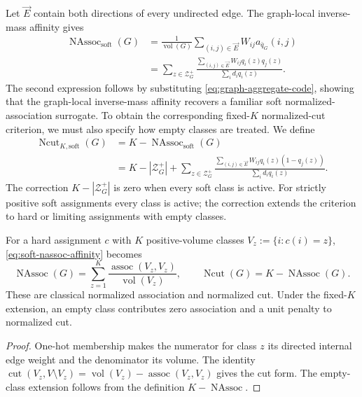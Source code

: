 Let $\vec E$ contain both directions of every undirected edge.
The graph-local inverse-mass affinity gives
\begin{align}
\operatorname{NAssoc}_{\mathrm{soft}}(G)
&=\frac1{\operatorname{vol}(G)}\sum_{(i,j)\in\vec E}W_{ij}a_{\bar q_G}(i,j)\\
&=\sum_{z\in\mathcal Z_G^+}
\frac{\sum_{(i,j)\in\vec E}W_{ij}q_i(z)q_j(z)}{\sum_i d_iq_i(z)}.
\label{eq:soft-nassoc-affinity}
\end{align}
The second expression follows by substituting \cref{eq:graph-aggregate-code}, showing that the graph-local inverse-mass affinity recovers a familiar soft normalized-association surrogate.
To obtain the corresponding fixed-$K$ normalized-cut criterion, we must also specify how empty classes are treated.
We define
\begin{align}
\operatorname{Ncut}_{K,\mathrm{soft}}(G)
&=K-\operatorname{NAssoc}_{\mathrm{soft}}(G)\\
&=K-|\mathcal Z_G^+|
+\sum_{z\in\mathcal Z_G^+}
\frac{\sum_{(i,j)\in\vec E}W_{ij}q_i(z)(1-q_j(z))}
{\sum_i d_iq_i(z)}.
\label{eq:soft-ncut-relational-distortion}
\end{align}
The correction $K-|\mathcal Z_G^+|$ is zero when every soft class is active.
For strictly positive soft assignments every class is active; the correction extends the criterion to hard or limiting assignments with empty classes.

\begin{proposition}
\label{prop:normalized-cut}
For a hard assignment $c$ with $K$ positive-volume classes $V_z:=\{i:c(i)=z\}$, \cref{eq:soft-nassoc-affinity} becomes
\begin{equation}
\operatorname{NAssoc}(G)=\sum_{z=1}^K
\frac{\operatorname{assoc}(V_z,V_z)}{\operatorname{vol}(V_z)},
\qquad
\operatorname{Ncut}(G)=K-\operatorname{NAssoc}(G).
\label{eq:hard-ncut}
\end{equation}
These are classical normalized association and normalized cut.
Under the fixed-$K$ extension, an empty class contributes zero association and a unit penalty to normalized cut.
\end{proposition}

\begin{proof}
One-hot membership makes the numerator for class $z$ its directed internal edge weight and the denominator its volume.
The identity $\operatorname{cut}(V_z,V\setminus V_z)=\operatorname{vol}(V_z)-\operatorname{assoc}(V_z,V_z)$ gives the cut form.
The empty-class extension follows from the definition $K-\operatorname{NAssoc}$.
\end{proof}

